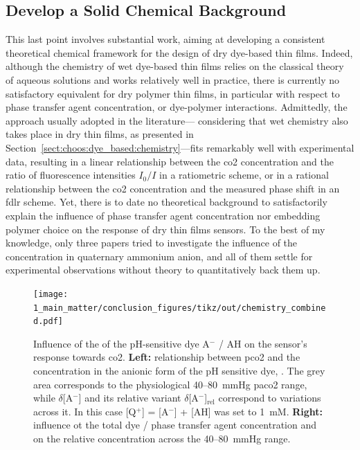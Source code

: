 \subsection{Develop a Solid Chemical Background}\label{subsect:conclusion:solid_chemistry}

This last point involves substantial work, aiming at developing a consistent theoretical chemical framework for the design of dry dye-based thin films. Indeed, although the chemistry of wet dye-based thin films relies on the classical theory of aqueous solutions and works relatively well in practice\cite{vurek1983, he1995, degrandpre1999}, there is currently no satisfactory equivalent for dry polymer thin films, in particular with respect to phase transfer agent concentration, or dye-polymer interactions. Admittedly, the approach usually adopted in the literature---\ie{} considering that wet chemistry also takes place in dry thin films, as presented in Section~\ref{sect:choos:dye_based:chemistry}---fits remarkably well with experimental data, resulting in a linear relationship between the \gls{co2} concentration and the ratio of fluorescence intensities $I_0/I$ in a ratiometric scheme\cite{borisov2007, chu2008, chu2009}, or in a rational relationship between the \gls{co2} concentration and the measured phase shift in an \gls{fdlr} scheme\cite{burke2006, cajlakovic2009}. Yet, there is to date no theoretical background to satisfactorily explain the influence of phase transfer agent concentration nor embedding polymer choice on the response of dry thin films sensors. To the best of my knowledge, only three papers tried to investigate the influence of the concentration in quaternary ammonium anion\cite{malins1998, fernandezsanchez2007, fernandezramos2018}, and all of them settle for experimental observations without theory to quantitatively back them up.

\begin{figure} %
	\centering
	\texttt{[image: 1\_main\_matter/conclusion\_figures/tikz/out/chemistry\_combined.pdf]}
	\caption[Influence of the \pKa{} of the pH-sensitive dye on the sensor's response towards \gls{co2}.]{Influence of the \pKa{} of the pH-sensitive dye A$^-$ / AH on the sensor's response towards \gls{co2}. \textbf{Left:} relationship between \gls{pco2} and the concentration in the anionic form of the pH sensitive dye, . The grey area corresponds to the physiological 40--80~mmHg \gls{paco2} range, while $\delta$[A$^-$] and its relative variant $\delta$[A$^-$]$_\text{rel}$ correspond to \ce{[A^-]} variations across it. In this case [Q$^+$] = [A$^-$] + [AH] was set to 1~mM. \textbf{Right:} influence ot the total dye / phase transfer agent concentration and \pKa{} on the relative  concentration across the 40--80~mmHg range.}
	\label{fig:conclusion:chemistry_combined}
\end{figure}


